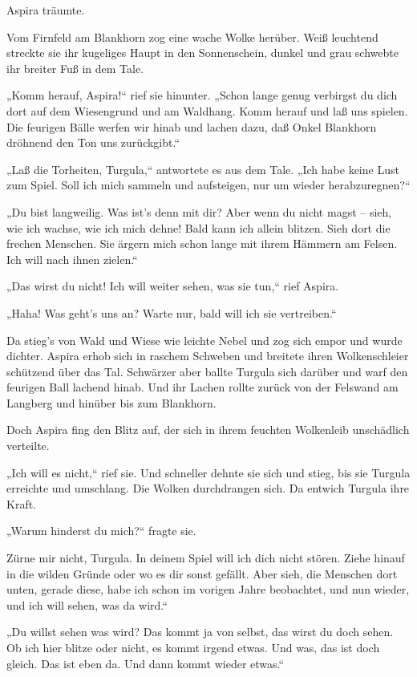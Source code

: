 Aspira träumte.

Vom Firnfeld am Blankhorn zog eine wache Wolke herüber. Weiß
leuchtend streckte sie ihr kugeliges Haupt in den Sonnenschein,
dunkel und grau schwebte ihr breiter Fuß in dem Tale.

„Komm herauf, Aspira!“ rief sie hinunter. „Schon lange genug
verbirgst du dich dort auf dem Wiesengrund und am Waldhang. Komm
herauf und laß uns spielen. Die feurigen Bälle werfen wir hinab und
lachen dazu, daß Onkel Blankhorn dröhnend den Ton uns zurückgibt.“

„Laß die Torheiten, Turgula,“ antwortete es aus dem Tale. „Ich habe
keine Lust zum Spiel. Soll ich mich sammeln und aufsteigen, nur um
wieder herabzuregnen?“

„Du bist langweilig. Was ist's denn mit dir? Aber wenn du nicht
magst – sieh, wie ich wachse, wie ich mich dehne! Bald kann ich
allein blitzen. Sieh dort die frechen Menschen. Sie ärgern mich
schon lange mit ihrem Hämmern am Felsen. Ich will nach ihnen
zielen.“

„Das wirst du nicht! Ich will weiter sehen, was sie tun,“ rief
Aspira.

„Haha! Was geht's uns an? Warte nur, bald will ich sie
vertreiben.“

Da stieg's von Wald und Wiese wie leichte Nebel und zog sich empor
und wurde dichter. Aspira erhob sich in raschem Schweben und
breitete ihren Wolkenschleier schützend über das Tal. Schwärzer
aber ballte Turgula sich darüber und warf den feurigen Ball lachend
hinab. Und ihr Lachen rollte zurück von der Felswand am Langberg
und hinüber bis zum Blankhorn.

Doch Aspira fing den Blitz auf, der sich in ihrem feuchten
Wolkenleib unschädlich verteilte.

„Ich will es nicht,“ rief sie. Und schneller dehnte sie sich und
stieg, bis sie Turgula erreichte und umschlang. Die Wolken
durchdrangen sich. Da entwich Turgula ihre Kraft.

„Warum hinderst du mich?“ fragte sie.

Zürne mir nicht, Turgula. In deinem Spiel will ich dich nicht
stören. Ziehe hinauf in die wilden Gründe oder wo es dir sonst
gefällt. Aber sieh, die Menschen dort unten, gerade diese, habe ich
schon im vorigen Jahre beobachtet, und nun wieder, und ich will
sehen, was da wird.“

„Du willst sehen was wird? Das kommt ja von selbst, das wirst du
doch sehen. Ob ich hier blitze oder nicht, es kommt irgend etwas.
Und was, das ist doch gleich. Das ist eben da. Und dann kommt
wieder etwas.“

